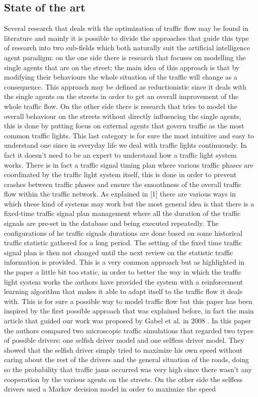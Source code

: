 \documentclass[a4paper,hidelinks]{article}
\begin{document}
\subsection{State of the art}
Several research that deals with the optimization of traffic flow may be found in literature and mainly it is possible to divide the approaches that guide this type of research into two sub-fields which both naturally suit the artificial intelligence agent paradigm: on the one side there is research that focuses on modelling the single agents that are on the street; the main idea of this approach is that by modifying their behaviours the whole situation of the traffic will change as a consequence. This approach may be defined as reductionistic since it deals with the single agents on the streets in order to get an overall improvement of the whole traffic flow. On the other side there is research that tries to model the overall behaviour on the streets without directly influencing the single agents, this is done by putting focus on external agents that govern traffic as the most common traffic lights. This last category is for sure the most intuitive and easy to understand one since in everyday life we deal with traffic lights continuously. In fact it doesn't need to be an expert to understand how a traffic light system works. There is in fact a traffic signal timing plan where various traffic phases are coordinated by the traffic light system itself, this is done in order to prevent crashes between traffic phases and ensure the smoothness of the overall traffic flow within the traffic network. As explained in [1] there are various ways in which these kind of systems may work but the most general idea is that there is a fixed-time traffic signal plan management where all the duration of the traffic signals are pre-set in the database and being executed repeatedly. The configurations of he traffic signals durations are done based on some historical traffic statistic gathered for a long period. The setting of the fixed time traffic signal plan is then not changed until the next review on the statistic traffic information is provided. This is a very common approach but as highlighted in the paper a little bit too static, in order to better the way in which the traffic light system works the authors have provided the system with a reinforcement learning algorithm that makes it able to adapt itself to the traffic flow it deals with. This is for sure a possible way to model traffic flow but this paper has been inspired by the first possible approach that was explained before, in fact the main article that guided our work was proposed by Gabel et al. in 2008 \cite{gabel2012cooperative}. In this paper the authors compared two microscopic traffic simulations that regarded two types of possible drivers: one selfish driver model and one selfless driver model. They showed that the selfish driver simply tried to maximize his own speed without caring about the rest of the drivers and the general situation of the roads, doing so the probability that traffic jams occurred was very high since there wasn't any cooperation by the various agents on the streets. On the other side the selfless drivers used a Markov decision model in order to maximize the speed 
\end{document}

